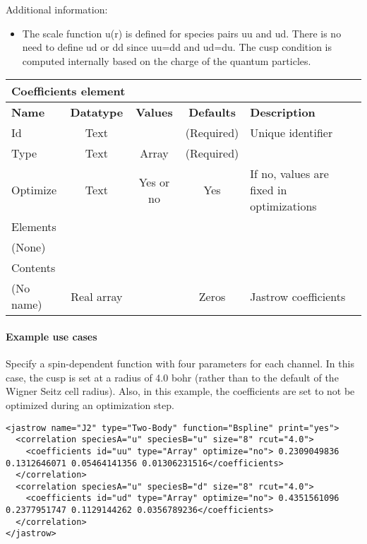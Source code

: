\FloatBarrier

Additional information:
\begin{itemize}
\item {} The scale function u(r) is defined for species pairs uu and ud.  
There is no need to define ud or dd since uu=dd and ud=du.  The cusp condition is computed internally 
based on the charge of the quantum particles.
\end{itemize}

\begin{table}[h]
\begin{center}
\begin{tabular}{l c c c l }
\hline
\multicolumn{5}{l}{Coefficients element} \\
\hline
\bfseries Name & \bfseries Datatype & \bfseries Values & \bfseries Defaults & \bfseries Description \\
\hline
Id & Text & & (Required) & Unique identifier \\
Type & Text & Array & (Required) & \\
Optimize & Text & Yes or no & Yes & If no, values are fixed in optimizations \\
\hline
\multicolumn{5}{l}{Elements}\\ \hline
(None) & & & \\ \hline
\multicolumn{5}{l}{Contents}\\ \hline
 (No name) & Real array & & Zeros & Jastrow coefficients \\ \hline
\end{tabular}
\end{center}
\end{table}

\paragraph{Example use cases}
\label{sec:2bjsplineexamples}

Specify a spin-dependent function with four parameters for each channel.  In this case, the cusp is set at 
a radius of 4.0 bohr (rather than to the default of the Wigner Seitz cell radius).  Also, in this example,
the coefficients are set to not be optimized during an optimization step.

\begin{lstlisting}[style=QMCPXML]
<jastrow name="J2" type="Two-Body" function="Bspline" print="yes">
  <correlation speciesA="u" speciesB="u" size="8" rcut="4.0">
    <coefficients id="uu" type="Array" optimize="no"> 0.2309049836 0.1312646071 0.05464141356 0.01306231516</coefficients>
  </correlation>
  <correlation speciesA="u" speciesB="d" size="8" rcut="4.0">
    <coefficients id="ud" type="Array" optimize="no"> 0.4351561096 0.2377951747 0.1129144262 0.0356789236</coefficients>
  </correlation>
</jastrow>
\end{lstlisting}
